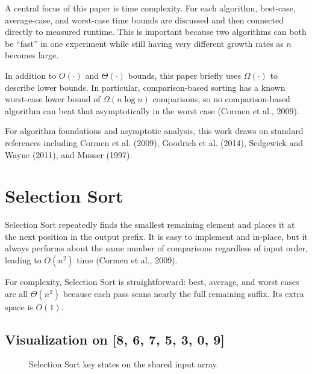 \documentclass[12pt]{article}
\begin{document}
A central focus of this paper is time complexity. For each algorithm, best-case, average-case, and worst-case time bounds are discussed and then connected directly to measured runtime. This is important because two algorithms can both be ``fast'' in one experiment while still having very different growth rates as $n$ becomes large.

In addition to $O(\cdot)$ and $\Theta(\cdot)$ bounds, this paper briefly uses $\Omega(\cdot)$ to describe lower bounds. In particular, comparison-based sorting has a known worst-case lower bound of $\Omega(n \log n)$ comparisons, so no comparison-based algorithm can beat that asymptotically in the worst case (Cormen et al., 2009).

For algorithm foundations and asymptotic analysis, this work draws on standard references including Cormen et al. (2009), Goodrich et al. (2014), Sedgewick and Wayne (2011), and Musser (1997).

\section{Selection Sort}
Selection Sort repeatedly finds the smallest remaining element and places it at the next position in the output prefix. It is easy to implement and in-place, but it always performs about the same number of comparisons regardless of input order, leading to $O(n^2)$ time (Cormen et al., 2009).

For complexity, Selection Sort is straightforward: best, average, and worst cases are all $\Theta(n^2)$ because each pass scans nearly the full remaining suffix. Its extra space is $O(1)$.

\subsection*{Visualization on [8, 6, 7, 5, 3, 0, 9]}
\begin{figure}[H]
\centering
{}
\caption{Selection Sort key states on the shared input array.}
\end{figure}
\end{document}
